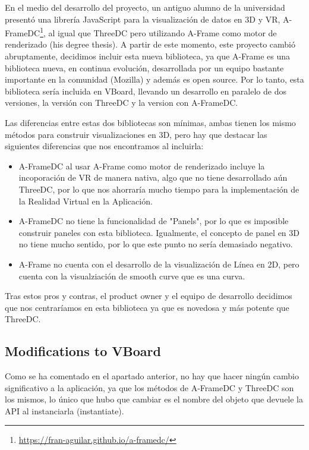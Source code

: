 \documentclass[a4paper, 12pt]{book}
\begin{document}
En el medio del desarrollo del proyecto, un antiguo alumno de la universidad presentó una librería JavaScript para la visualización de datos en 3D y VR, A-FrameDC\footnote{\url{https://fran-aguilar.github.io/a-framedc/}}, al igual que ThreeDC pero utilizando A-Frame como motor de renderizado (his degree thesis). A partir de este momento, este proyecto cambió abruptamente, decidimos incluir esta nueva biblioteca, ya que A-Frame es una biblioteca nueva, en continua evolución, desarrollada por un equipo bastante importante en la comunidad (Mozilla) y además es open source. Por lo tanto, esta biblioteca sería incluida en VBoard, llevando un desarrollo en paralelo de dos versiones, la versión con ThreeDC y la version con A-FrameDC.

Las diferencias entre estas dos bibliotecas son mínimas, ambas tienen los mismo métodos para construir visualizaciones en 3D, pero hay que destacar las siguientes diferencias que nos encontramos al incluirla:

\begin{itemize}
    \item A-FrameDC al usar A-Frame como motor de renderizado incluye la incoporación de VR de manera nativa, algo que no tiene desarrollado aún ThreeDC, por lo que nos ahorraría mucho tiempo para la implementación de la Realidad Virtual en la Aplicación.
    \item A-FrameDC no tiene la funcionalidad de "Panels", por lo que es imposible construir paneles con esta biblioteca. Igualmente, el concepto de panel en 3D no tiene mucho sentido, por lo que este punto no sería demasiado negativo.
    \item A-Frame no cuenta con el desarrollo de la visualización de Línea en 2D, pero cuenta con la visualziación de smooth curve que es una curva.
\end{itemize}

Tras estos pros y contras, el product owner y el equipo de desarrollo decidimos que nos centraríamos en esta biblioteca ya que es novedosa y más potente que ThreeDC.

\subsection{Modifications to VBoard}

Como se ha comentado en el apartado anterior, no hay que hacer ningún cambio significativo a la aplicación, ya que los métodos de A-FrameDC y ThreeDC son los mismos, lo único que hubo que cambiar es el nombre del objeto que devuele la API al instanciarla (instantiate).
\end{document}
